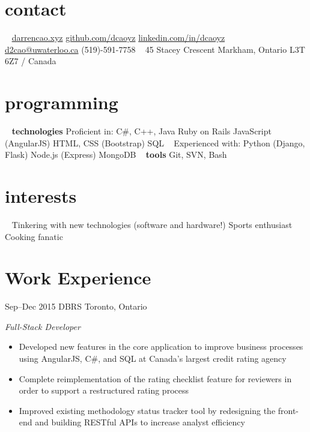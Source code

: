 \documentclass[print]{resume} %
\begin{document}


\begin{aside}
\section{contact}
~
\href{http://darrencao.xyz}{darrencao.xyz}
\href{https://github.com/dcaoyz}{github.com/dcaoyz}
\href{https://ca.linkedin.com/in/dcaoyz}{linkedin.com/in/dcaoyz}
~
\href{mailto:d2cao@uwaterloo.ca}{d2cao@uwaterloo.ca}
(519)-591-7758
~
45 Stacey Crescent
Markham, Ontario
L3T 6Z7 / Canada
~
\section{programming}
~
{\textbf{technologies}
Proficient in:
C\#, C++, Java
Ruby on Rails
JavaScript (AngularJS)
HTML, CSS (Bootstrap)
SQL}
~
Experienced with:
Python (Django, Flask)
Node.js (Express)
MongoDB
~
\textbf{tools}
Git, SVN, Bash
~
\section{interests}
~
Tinkering with new technologies (software and hardware!)
Sports enthusiast
Cooking fanatic
\end{aside}


\section{Work Experience}


\begin{entrylist}
\entry
{Sep--Dec 2015}
{DBRS}
{Toronto, Ontario}
{\emph{Full-Stack Developer}
\begin{itemize}
\item Developed new features in the core application to improve business processes using AngularJS, C\#, and SQL at Canada's largest credit rating agency
\item Complete reimplementation of the rating checklist feature for reviewers in order to support a restructured rating process
\item Improved existing methodology status tracker tool by redesigning the front-end and building RESTful APIs to increase analyst efficiency \end{itemize}}
\end{entrylist}
\end{document}
